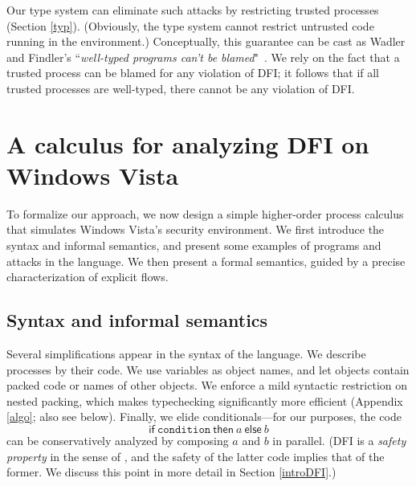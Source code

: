 \documentclass{sigplanconf}
\begin{document}
Our type system can eliminate such attacks by restricting trusted processes (Section \ref{typ}).
(Obviously, the type system cannot restrict untrusted code running in the environment.) Conceptually, this guarantee can be cast as Wadler and Findler's ``\emph{well-typed programs can't be blamed}"~\cite{blame}. 
We rely on the fact that a trusted process can be blamed for any violation of DFI; it follows that if all trusted processes are well-typed, there cannot be any violation of DFI. 


\section{A calculus for analyzing DFI on Windows Vista}\label{calc}
To formalize our approach, we now design a simple higher-order process calculus that simulates Windows Vista's security environment. We first introduce the syntax and informal semantics, and present some examples of programs and attacks in the language. We then present a formal semantics, guided by a precise characterization of explicit flows. 

\subsection{Syntax and informal semantics}

Several simplifications appear in the syntax of the language. We describe processes by their code. We use variables as object names, and let objects contain packed code or names of other objects. We enforce a mild syntactic restriction on nested packing, which makes typechecking significantly more efficient (Appendix \ref{algo}; also see below). 
Finally, we elide conditionals---for our purposes, the code 
$$\mathsf{if}~\mathtt{condition}~\mathsf{then}~a~\mathsf{else}~b$$
can be conservatively analyzed by composing $a$ and $b$ in parallel. (DFI is a \emph{safety property} in the sense of \cite{alpernschneider}, and the safety of the latter code implies that of the former. We discuss this point in more detail in Section \ref{introDFI}.) 
\end{document}
